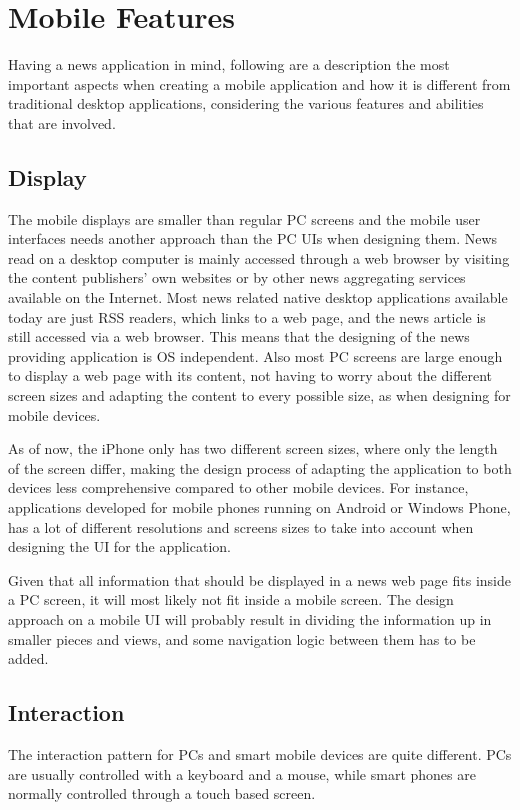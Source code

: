 \chapter{Mobile Features}
\label{chapter_mobile_features}

Having a news application in mind, following are a description the most important aspects when creating a mobile application and how it is different from traditional desktop applications, considering the various features and abilities that are involved.

\section{Display}
The mobile displays are smaller than regular PC screens and the mobile user interfaces needs another approach than the PC UIs when designing them. News read on a desktop computer is mainly accessed through a web browser by visiting the content publishers' own websites or by other news aggregating services available on the Internet. Most news related native desktop applications available today are just RSS readers, which links to a web page, and the news article is still accessed via a web browser. This means that the designing of the news providing application is OS independent. Also most PC screens are large enough to display a web page with its content, not having to worry about the different screen sizes and adapting the content to every possible size, as when designing for mobile devices.

As of now, the iPhone only has two different screen sizes, where only the length of the screen differ, making the design process of adapting the application to both devices less comprehensive compared to other mobile devices. For instance, applications developed for mobile phones running on Android or Windows Phone, has a lot of different resolutions and screens sizes to take into account when designing the UI for the application.

Given that all information that should be displayed in a news web page fits inside a PC screen, it will most likely not fit inside a mobile screen. The design approach on a mobile UI will probably result in dividing the information up in smaller pieces and views, and some navigation logic between them has to be added.

\section{Interaction}
The interaction pattern for PCs and smart mobile devices are quite different. PCs are usually controlled with a keyboard and a mouse, while smart phones are normally controlled through a touch based screen.

